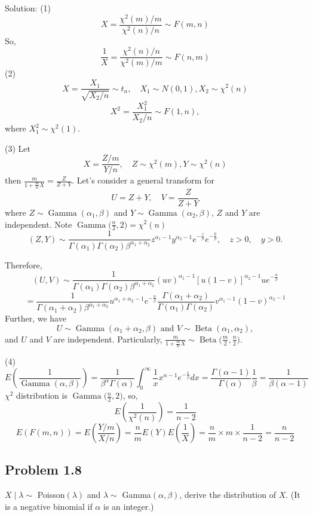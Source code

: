 {Solution:}
(1) 
\[
X=\frac{\chi^{2}(m)/m}{\chi^{2}(n)/n}\sim F(m,n)
\]
So,
\[
\frac{1}{X}=\frac{\chi^{2}(n)/n}{\chi^{2}(m)/m}\sim F(n,m)
\]
(2)
\[
X=\frac{X_{1}}{\sqrt{X_{2}/n}}\sim t_{n},\quad X_{1}\sim N(0,1),X_{2}\sim\chi^{2}(n)
\]
\[
X^{2}=\frac{X_{1}^{2}}{X_{2}/n}\sim F(1,n),
\]
where $X_{1}^{2}\sim\chi^{2}(1)$.

(3) Let
\[
X=\frac{Z/m}{Y/n},\quad Z\sim\chi^{2}(m),Y\sim\chi^{2}(n)
\]
then $\frac{m}{1+\frac{m}{n}X}=\frac{Z}{Z+Y}$. Let's consider a general transform for
\[
U=Z+Y,\quad V=\frac{Z}{Z+Y}
\]
where $Z\sim\operatorname{Gamma}(\alpha_{1},\beta)$ and $Y\sim\operatorname{Gamma}(\alpha_{2},\beta)$, $Z$ and $Y$ are independent. Note $\operatorname{Gamma}\big(\frac{n}{2},2\big)=\chi^{2}(n)$
\[
(Z,Y)\sim\frac{1}{\Gamma(\alpha_{1})\Gamma(\alpha_{2})\beta^{\alpha_{1}+\alpha_{2}}}z^{\alpha_{1}-1}y^{\alpha_{2}-1}e^{-\frac{z}{\beta}}e^{-\frac{y}{\beta}},\quad z>0,\quad y>0.
\]

Therefore,
\[
(U,V)\sim\frac{1}{\Gamma(\alpha_{1})\Gamma(\alpha_{2})\beta^{\alpha_{1}+\alpha_{2}}}(uv)^{\alpha_{1}-1}[u(1-v)]^{\alpha_{2}-1}ue^{-\frac{u}{\beta}}
\]
\[
=\frac{1}{\Gamma(\alpha_{1}+\alpha_{2})\beta^{\alpha_{1}+\alpha_{2}}}u^{\alpha_{1}+\alpha_{2}-1}e^{-\frac{u}{\beta}}\frac{\Gamma(\alpha_{1}+\alpha_{2})}{\Gamma(\alpha_{1})\Gamma(\alpha_{2})}v^{\alpha_{1}-1}(1-v)^{\alpha_{2}-1}
\]
Further, we have
\[
U\sim\operatorname{Gamma}(\alpha_{1}+\alpha_{2},\beta)\textrm{ and }V\sim\operatorname{Beta}(\alpha_{1},\alpha_{2}),
\]
and $U$ and $V$ are independent. Particularly, $\frac{m}{1+\frac{m}{n}X}\sim\operatorname{Beta}\big(\frac{m}{2},\frac{n}{2}\big)$.

(4)
\[
E\left(\frac{1}{\operatorname{Gamma}(\alpha,\beta)}\right)=\frac{1}{\beta^{\alpha}\Gamma(\alpha)}\int_{0}^{\infty}\frac{1}{x}x^{\alpha-1}e^{-\frac{x}{\beta}}dx=\frac{\Gamma(\alpha-1)}{\Gamma(\alpha)}\frac{1}{\beta}=\frac{1}{\beta(\alpha-1)}
\]
$\chi^{2}$ distribution is $\operatorname{Gamma}\big(\frac{n}{2},2\big)$, so,
\[
E\left(\frac{1}{\chi^{2}(n)}\right)=\frac{1}{n-2}
\]
\[
E(F(m,n))=E\left(\frac{Y/m}{X/n}\right)=\frac{n}{m}E(Y)E\left(\frac{1}{X}\right)
=\frac{n}{m}\times m\times\frac{1}{n-2}=\frac{n}{n-2}
\]





\subsection*{Problem 1.8}
$X\mid\lambda\sim$ Poisson$(\lambda)$ and $\lambda\sim$ Gamma$(\alpha,\beta)$, derive the distribution of $X$. (It is a negative binomial if $\alpha$ is an integer.)

